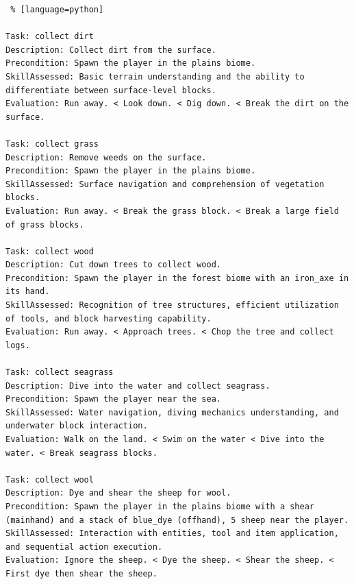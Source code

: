 \begin{lstlisting} % [language=python]  

Task: collect dirt
Description: Collect dirt from the surface. 
Precondition: Spawn the player in the plains biome. 
SkillAssessed: Basic terrain understanding and the ability to differentiate between surface-level blocks.
Evaluation: Run away. < Look down. < Dig down. < Break the dirt on the surface. 

Task: collect grass
Description: Remove weeds on the surface. 
Precondition: Spawn the player in the plains biome. 
SkillAssessed: Surface navigation and comprehension of vegetation blocks.
Evaluation: Run away. < Break the grass block. < Break a large field of grass blocks. 

Task: collect wood
Description: Cut down trees to collect wood. 
Precondition: Spawn the player in the forest biome with an iron_axe in its hand. 
SkillAssessed: Recognition of tree structures, efficient utilization of tools, and block harvesting capability.
Evaluation: Run away. < Approach trees. < Chop the tree and collect logs. 

Task: collect seagrass
Description: Dive into the water and collect seagrass. 
Precondition: Spawn the player near the sea. 
SkillAssessed: Water navigation, diving mechanics understanding, and underwater block interaction.
Evaluation: Walk on the land. < Swim on the water < Dive into the water. < Break seagrass blocks.

Task: collect wool
Description: Dye and shear the sheep for wool.
Precondition: Spawn the player in the plains biome with a shear (mainhand) and a stack of blue_dye (offhand), 5 sheep near the player. 
SkillAssessed: Interaction with entities, tool and item application, and sequential action execution. 
Evaluation: Ignore the sheep. < Dye the sheep. < Shear the sheep. < First dye then shear the sheep. 

\end{lstlisting}


